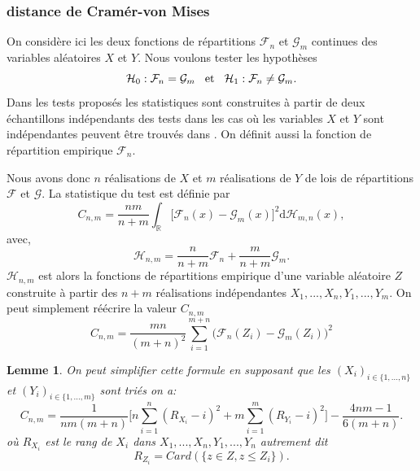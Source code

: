\documentclass[a4paper,10pt]{article}
\newtheorem{lemma}{Lemme}
\begin{document}
\subsubsection{distance de Cramér-von Mises}
On considère ici les deux fonctions de répartitions $\mathcal{F}_{n}$ et $\mathcal{G}_{m}$ continues des variables aléatoires $X$ et $Y$. Nous voulons tester les hypothèses
\begin{equation*}
	\mathcal{H}_0 : \mathcal{F}_{n} = \mathcal{G}_{m} \hspace{3mm}\textrm{et}\hspace{3mm} \mathcal{H}_1 : \mathcal{F}_{n} \neq \mathcal{G}_{m}.
\end{equation*}
Dans les tests proposés les statistiques sont construites à partir de deux échantillons indépendants des tests dans les cas où les variables $X$ et $Y$ sont indépendantes peuvent être trouvés dans \cite{ethier2011propos}. On définit aussi la fonction de répartition empirique $\mathcal{F}_n$.

Nous avons donc $n$ réalisations de $X$ et $m$ réalisations de $Y$ de lois de répartitions $\mathcal{F}$ et $\mathcal{G}$.
La statistique du test est définie par
\begin{equation}
	C_{n,m}=\frac{nm}{n+m}\int_{\mathbb{R}}\big[ \mathcal{F}_{n}(x)-\mathcal{G}_{m}(x)\big]^{2} \mathrm{d} \mathcal{H}_{m,n}(x),
\end{equation}
avec,
\begin{equation}
	\mathcal{H}_{n,m}=\frac{n}{n+m}\mathcal{F}_n+\frac{m}{n+m}\mathcal{G}_m.
\end{equation}
$\mathcal{H}_{n,m}$ est alors la fonctions de répartitions empirique d'une variable aléatoire $Z$ construite à partir des $n+m$ réalisations indépendantes $X_1,...,X_n,Y_1,...,Y_m$. On peut simplement réécrire la valeur $C_{n,m}$
\begin{equation}
	C_{n,m}=\frac{mn}{(m+n)^2}\sum_{i=1}^{m+n}\big(\mathcal{F}_n(Z_i)-\mathcal{G}_{m}(Z_i)\big)^2
\end{equation}

\begin{lemma}
	\label{C-v}
	On peut simplifier cette formule en supposant que les $(X_i)_{i\in \{1,...,n\}}$ et $(Y_i)_{i\in \{1,...,m\}}$ sont triés on a:
	\begin{equation}
		C_{n,m}=\frac{1}{nm(m+n)}\Big[ n\sum_{i=1}^{n}(R_{X_i}-i)^2+ m\sum_{i=1}^{m}(R_{Y_i}-i)^2\Big]-\frac{4nm-1}{6(m+n)}.
	\end{equation}
	où $R_{X_i}$ est le rang de $X_i$ dans $X_1,...,X_n,Y_1,...,Y_n$ autrement dit 
	\[R_{Z_i}=Card(\{z\in Z, z\leq Z_i\}).\] 
\end{lemma}
\end{document}
